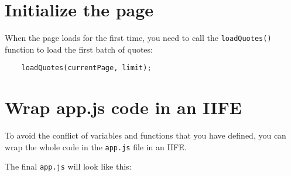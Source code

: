 \documentclass[11pt]{article}
\begin{document}
\section*{Initialize the page}

When the page loads for the first time, you need to call the
\verb|loadQuotes()| function to load the first batch of quotes:

\begin{lstlisting}
    loadQuotes(currentPage, limit);
\end{lstlisting}

\section*{Wrap app.js code in an IIFE}

To avoid the conflict of variables and functions that you have defined,
you can wrap the whole code in the \verb|app.js| file in an IIFE.
\newline

\noindent
The final \verb|app.js| will look like this:
\end{document}
